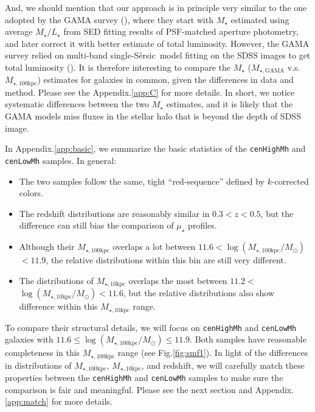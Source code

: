 \documentclass{emulateapj}
\def\ser{{S\'{e}rsic\ }}
\def\rbcg{\texttt{cenHighMh}}
\def\nbcg{\texttt{cenLowMh}}
\def\mstar{{$M_{\star}$}}
\def\minn{{$M_{\star,10\mathrm{kpc}}$}}
\def\mtot{{$M_{\star,100\mathrm{kpc}}$}}
\def\mgama{{$M_{\star,\mathrm{GAMA}}$}}
\def\logminn{{$\log (M_{\star,10\mathrm{kpc}}/M_{\odot})$}}
\def\logmtot{{$\log (M_{\star,100\mathrm{kpc}}/M_{\odot})$}}
\def\m2l{{$M_{\star}/L_{\star}$}}
\def\mden{{$\mu_{\star}$}}
\newcommand{\update}[1]{\textcolor{Bittersweet}{#1}}
\begin{document}
\begin{CJK*}{UTF8}{gbsn}
    And, we should mention that our approach is in principle very similar to the 
    one adopted by the GAMA survey (\citealt{Taylor2011}), where they start with 
    \mstar{} estimated using average \m2l{} from SED fitting results of
    PSF-matched aperture photometry, and later correct it with better estimate 
    of total luminosity.  
    However, the GAMA survey relied on multi-band single-\ser model fitting on 
    the SDSS images to get total luminosity (\citealt{Kelvin2012}). 
    It is therefore interesting to compare the \mstar{} (\mgama{} v.s. \mtot{})
    estimates for galaxies in common, given the differences in data and method. 
    Please see the Appendix.\ref{app:C} for more details. 
    In short, we notice systematic differences between the two \mstar{} estimates, 
    and it is likely that the GAMA models miss fluxes in the stellar halo that 
    is beyond the depth of SDSS image. 
    
    \update{In Appendix.\ref{app:basic}, we summarize the basic statistics of 
    the \rbcg{} and \nbcg{} samples.  In general:}
    
    \begin{itemize}
        \item \update{The two samples follow the same, tight ``red-sequence'' 
            defined by $k$-corrected colors.}
        \item \update{The redshift distributions are reasonably similar in 
            $0.3 < z < 0.5$, but the difference can still bias the comparison of
            \mden{} profiles.}
        \item \update{Although their \mtot{} overlaps a lot between 
            $11.6 <$\logmtot{}$< 11.9$, the relative distributions within this 
            bin are still very different.}
        \item \update{The distributions of \minn{} overlaps the most between 
            $11.2 <$\logminn{}$< 11.6$, but the relative distributions also 
            show difference within this \minn{} range.}
    \end{itemize}

    \update{To compare their structural details, we will focus on \rbcg{} and 
    \nbcg{} galaxies with $11.6 \le$\logmtot{}$\le 11.9$.  
    Both samples have reasonable completeness in this \mtot{} range
    (see Fig.\ref{fig:smf1}).
    In light of the differences in distributions of \mtot{}, \minn{}, and redshift, 
    we will carefully match these properties between the \rbcg{} and \nbcg{}
    samples to make sure the comparison is fair and meaningful.  
    Please see the next section and Appendix.\ref{app:match} for more details.}
    

\end{CJK*}
\end{document}
